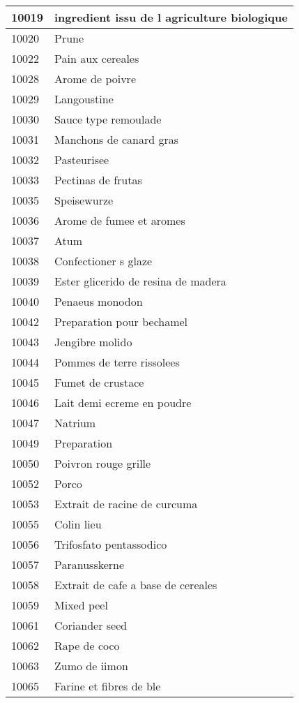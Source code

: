 \begin{longtable}{|l|l|}
10019 &  ingredient issu de l agriculture biologique \\ \hline 
10020 & Prune \\ \hline 
10022 & Pain aux cereales \\ \hline 
10028 & Arome de poivre \\ \hline 
10029 & Langoustine \\ \hline 
10030 & Sauce type remoulade \\ \hline 
10031 & Manchons de canard gras \\ \hline 
10032 & Pasteurisee \\ \hline 
10033 & Pectinas de frutas \\ \hline 
10035 & Speisewurze \\ \hline 
10036 & Arome de fumee et aromes \\ \hline 
10037 & Atum \\ \hline 
10038 & Confectioner s glaze \\ \hline 
10039 & Ester glicerido de resina de madera \\ \hline 
10040 & Penaeus monodon \\ \hline 
10042 & Preparation pour bechamel \\ \hline 
10043 & Jengibre molido \\ \hline 
10044 & Pommes de terre rissolees \\ \hline 
10045 & Fumet de crustace \\ \hline 
10046 & Lait demi ecreme en poudre \\ \hline 
10047 & Natrium \\ \hline 
10049 & Preparation \\ \hline 
10050 & Poivron rouge grille \\ \hline 
10052 & Porco \\ \hline 
10053 & Extrait de racine de curcuma \\ \hline 
10055 & Colin lieu \\ \hline 
10056 & Trifosfato pentassodico \\ \hline 
10057 & Paranusskerne \\ \hline 
10058 & Extrait de cafe a base de cereales \\ \hline 
10059 & Mixed peel \\ \hline 
10061 & Coriander seed \\ \hline 
10062 & Rape de coco \\ \hline 
10063 & Zumo de iimon \\ \hline 
10065 & Farine et fibres de ble \\ \hline 

\end{longtable}
